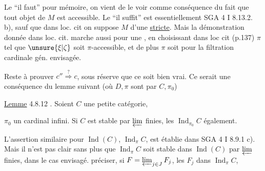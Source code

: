 
Le ``il faut''   pour mémoire, on vient de le voir comme conséquence du fait que tout objet de $M$ est accessible. Le ``il suffit'' est essentiellement SGA 4 I 8.13.2. b), sauf que dans loc. cit on suppose $M$  d'une  \uline{stricte}. Mais la démonstration donnée dans loc. cit. marche aussi pour une , en choisissant dans loc cit (p.137) $\pi$ tel que $\unsure{\xi|\zeta}$ soit $\pi$-accessible, et de plus $\pi$ soit \uline{} pour la filtration cardinale gén. envisagée.

Reste à prouver $c''\overset{?}{\Longrightarrow}c$, sous réserve que ce soit bien vrai. Ce serait une conséquence du lemme suivant (où $D,\pi$ sont  par $C,\pi_0$)

\uline{Lemme} 4.8.12 . Soient $C$ une petite catégorie,


$\pi_0$ un cardinal infini. Si $C$ est stable par $\varprojlim$ finies, les $\operatorname{Ind}_{\pi_0}C$ également.

L'assertion similaire pour $\operatorname{Ind}(C)$,  $\operatorname{Ind}_{\pi}C$, est établie dans SGA 4 I 8.9.1 c). Mais il n'est pas clair sans plus que $\operatorname{Ind}_{\pi}C$ soit stable dans $\operatorname{Ind}(C)$ par $\varprojlim$ finies, dans le cas envisagé.    préciser, si $F=\varprojlim_{j\in J}F_j$, les $F_j$ dans $\operatorname{Ind}_{\pi}C$,
